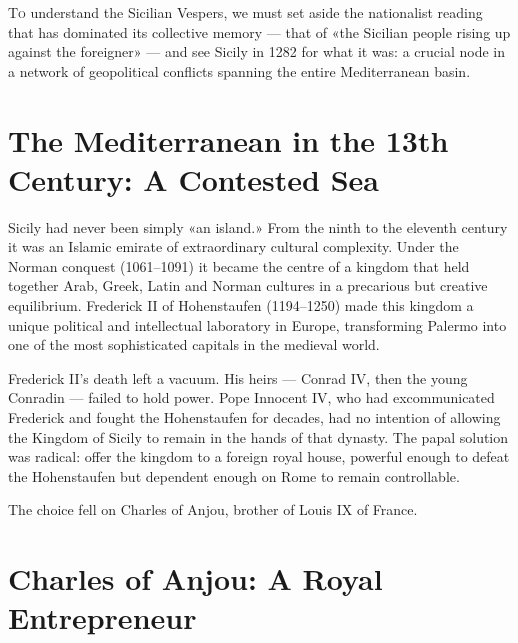 \lettrine[lines=4]{T}{o} understand the Sicilian Vespers, we must set
aside the nationalist reading that has dominated its collective memory
— that of «the Sicilian people rising up against the foreigner» — and
see Sicily in 1282 for what it was: a crucial node in a network of
geopolitical conflicts spanning the entire Mediterranean basin.


\section{The Mediterranean in the 13th Century: A Contested Sea}

Sicily had never been simply «an island.» From the ninth to the eleventh
century it was an Islamic emirate of extraordinary cultural complexity.
Under the Norman conquest (1061–1091) it became the centre of a kingdom
that held together Arab, Greek, Latin and Norman cultures in a precarious
but creative equilibrium. Frederick II of Hohenstaufen (1194–1250) made
this kingdom a unique political and intellectual laboratory in Europe,
transforming Palermo into one of the most sophisticated capitals in the
medieval world.

Frederick II's death left a vacuum. His heirs — Conrad IV, then the young
Conradin — failed to hold power. Pope Innocent IV, who had excommunicated
Frederick and fought the Hohenstaufen for decades, had no intention of
allowing the Kingdom of Sicily to remain in the hands of that dynasty.
The papal solution was radical: offer the kingdom to a foreign royal house,
powerful enough to defeat the Hohenstaufen but dependent enough on Rome
to remain controllable.

The choice fell on Charles of Anjou, brother of Louis IX of France.

\secsep

\section{Charles of Anjou: A Royal Entrepreneur}

